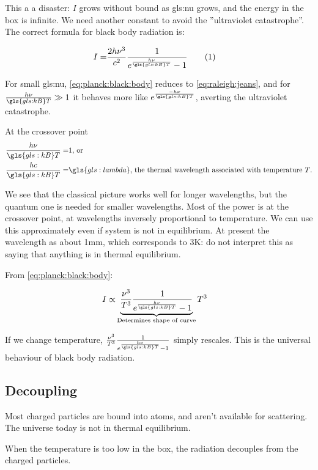 \documentclass[]{article}
\newcommand\numberthis{\addtocounter{equation}{1}\tag{\theequation}}
\begin{document}
This a a disaster: $I$ grows without bound as \gls{gls:nu} grows, and the energy in the box is infinite. We need another constant to avoid the ''ultraviolet catastrophe''. The correct formula for black body radiation is:
 
\begin{align*}
	I =& \frac{2 h \nu^3}{c^2} \frac{1}{e^\frac{h\nu}{\gls{gls:kB}T}-1} \numberthis \label{eq:planck:black:body}
\end{align*}

For small \gls{gls:nu}, \eqref{eq:planck:black:body} reduces to \eqref{eq:raleigh:jeans}, and for  $\frac{h\nu}{\gls{gls:kB}T} \gg 1$ it behaves more like $e^\frac{-h\nu}{\gls{gls:kB}T}$, averting the ultraviolet catastrophe.

At the crossover point
\begin{align*}
	\frac{h\nu}{\gls{gls:kB}T} =& 1 \text{, or}\\
	\frac{hc}{\gls{gls:kB}T} =& \gls{gls:lambda} \text{, the thermal wavelength associated with  temperature $T$.}
\end{align*}

We see that the classical picture works well for longer wavelengths, but the quantum one is needed for smaller wavelengths. Most of the power is at the crossover point, at wavelengths inversely proportional to temperature. We can use this approximately even if system is not in equilibrium. At present the wavelength as about 1mm, which corresponds to 3K: do not interpret this as saying that anything is in thermal equilibrium.

From \eqref{eq:planck:black:body}:

\begin{align*}
	I \propto & \underbrace{\frac{\nu^3}{T^3} \frac{1}{e^\frac{h\nu}{\gls{gls:kB}T}-1}}_\text{Determines shape of curve} T^3
\end{align*}

If we change temperature, $\frac{\nu^3}{T^3} \frac{1}{e^\frac{h\nu}{\gls{gls:kB}T}-1}$ simply rescales. This is the universal behaviour of black body radiation.

\subsection{Decoupling}
Most charged particles are bound into atoms, and aren't available for scattering. The universe today is not in thermal equilibrium.

When the temperature is too low in the box, the radiation decouples from the charged particles.
\end{document}
